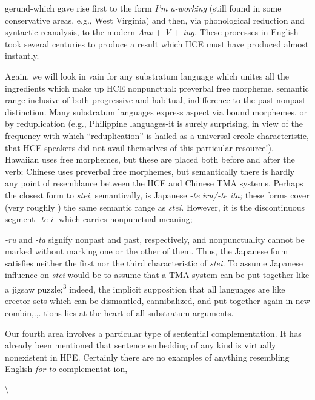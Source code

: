 
gerund-which gave rise first to the form \textit{I'm a-working }(still found in some conservative areas, e.g., West Virginia) and then, via phono\-logical reduction and syntactic reanalysis, to the modern \textit{Aux} + \textit{V} + \textit{i}\textit{n}\textit{g.} These processes in English took several centuries to produce a result which HCE must have produced almost instantly.

Again, we will look in vain for any substratum language which unites all the ingredients which make up HCE nonpunctual: preverbal free morpheme, semantic range inclusive of both progressive and habi\-tual, indifference to the past-nonpast distinction. Many substratum languages express aspect via bound morphemes, or by reduplication (e.g., Philippine languages-it is surely surprising, in view of the fre\-quency with which ``reduplication'' is hailed as a universal creole characteristic, that HCE speakers did not avail themselves of this particular resource!). Hawaiian uses free morphemes, but these are placed both before and after the verb; Chinese uses preverbal free morphemes, but semantically there is hardly any point of resemblance between the HCE and Chinese TMA systems. Perhaps the closest form to \textit{stei,} semantically, is Japanese \textit{{}-te} \textit{iru/-te} \textit{ita;} these forms cover (very roughly ) the same semantic range as \textit{stei.} However, it is the discontinuous segment \textit{{}-te }\textit{i- }which carries nonpunctual meaning;

\textit{{}-ru} and \textit{{}-ta} signify nonpast and past, respectively, and nonpunctuality cannot be marked without marking one or the other of them. Thus, the Japanese form satisfies neither the first nor the third characteristic of \textit{stei.} To assume Japanese influence on \textit{stei} would be to assume that a TMA system can be put together like a jigsaw puzzle;\textsuperscript{3} indeed, the implicit supposition that all languages are like erector sets which can be dismantled, cannibalized, and put together again in new combin,.,. tions lies at the heart of all substratum arguments.

Our fourth area involves a particular type of sentential comple\-mentation. It has already been mentioned that sentence embedding of any kind is virtually nonexistent in HPE. Certainly there are no examples of anything resembling English \textit{for-to }complementat ion,

{\textbackslash}

